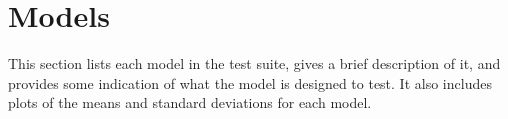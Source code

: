 \documentclass[12pt,a4paper]{article}
\begin{document}
\section{Models}

This section lists each model in the test suite, gives a brief
description of it, and provides some indication of what the model is
designed to test. It also includes plots of the means and standard
deviations for each model.




\end{document}
